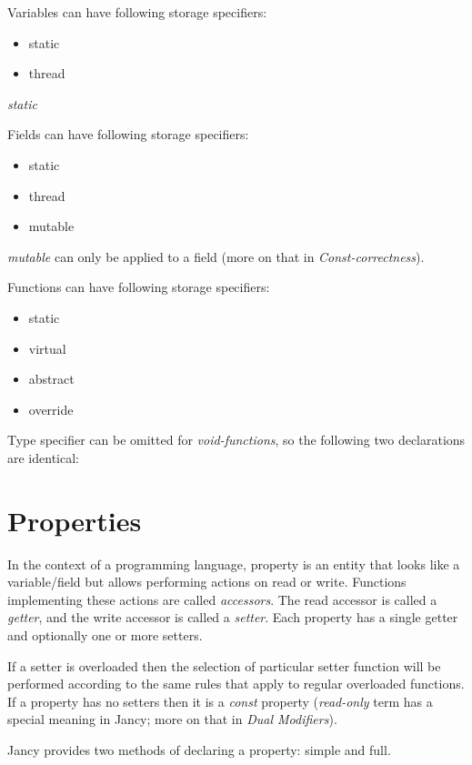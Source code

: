 \documentclass[oneside]{book}
\begin{document}
Variables can have following storage specifiers:

\begin{itemize}
\item static
\item thread
\end{itemize}

\emph{static} 

Fields can have following storage specifiers:

\begin{itemize}
\item static
\item thread
\item mutable
\end{itemize}

\emph{mutable} can only be applied to a field (more on that in \emph{Const-correctness}).

Functions can have following storage specifiers:

\begin{itemize}
\item static
\item virtual
\item abstract
\item override
\end{itemize}

Type specifier can be omitted for \emph{void-functions}, so the following two declarations are identical:

\section{Properties}

In the context of a programming language, property is an entity that looks like a variable/field but allows performing actions on read or write. Functions implementing these actions are called \emph{accessors}. The read accessor is called a \emph{getter}, and the write accessor is called a \emph{setter}. Each property has a single getter and optionally one or more setters.

If a setter is overloaded then the selection of particular setter function will be performed according to the same rules that apply to regular overloaded functions. If a property has no setters then it is a \emph{const} property (\emph{read-only} term has a special meaning in Jancy; more on that in \emph{Dual Modifiers}).

Jancy provides two methods of declaring a property: simple and full.
\end{document}
